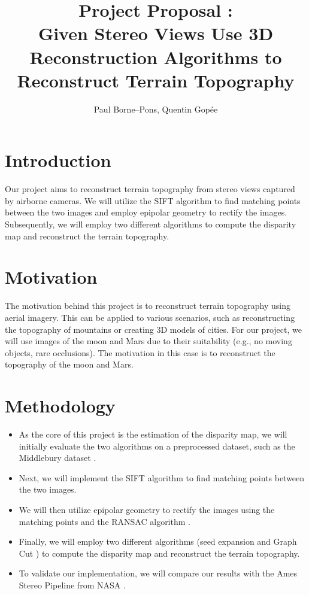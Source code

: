 \documentclass[10pt,twocolumn,letterpaper]{article}
\begin{document}
\title{Project Proposal : \\
Given Stereo Views Use 3D Reconstruction Algorithms to Reconstruct Terrain Topography \\
}


\author{Paul Borne--Pons, Quentin Gopée}
\maketitle

\section{Introduction}

Our project aims to reconstruct terrain topography from stereo views captured by airborne cameras. We will utilize the SIFT algorithm to find matching points between the two images and employ epipolar geometry to rectify the images. Subsequently, we will employ two different algorithms to compute the disparity map and reconstruct the terrain topography.

\section{Motivation}

The motivation behind this project is to reconstruct terrain topography using aerial imagery. This can be applied to various scenarios, such as reconstructing the topography of mountains or creating 3D models of cities. For our project, we will use images of the moon and Mars due to their suitability (e.g., no moving objects, rare occlusions). The motivation in this case is to reconstruct the topography of the moon and Mars.

\section{Methodology}
\begin{itemize}
    \item As the core of this project is the estimation of the disparity map, we will initially evaluate the two algorithms on a preprocessed dataset, such as the Middlebury dataset \cite{VisionMiddleburyEdu}.
    \item Next, we will implement the SIFT algorithm \cite{lindebergScaleInvariantFeature2012} to find matching points between the two images.
    \item We will then utilize epipolar geometry to rectify the images using the matching points and the RANSAC algorithm \cite{fischlerRandomSampleConsensus1981}.
    \item Finally, we will employ two different algorithms (seed expansion and Graph Cut \cite{kolomogorov}) to compute the disparity map and reconstruct the terrain topography.
    \item To validate our implementation, we will compare our results with the Ames Stereo Pipeline from NASA \cite{beyerAmesStereoPipeline2018}.
\end{itemize}
\end{document}

